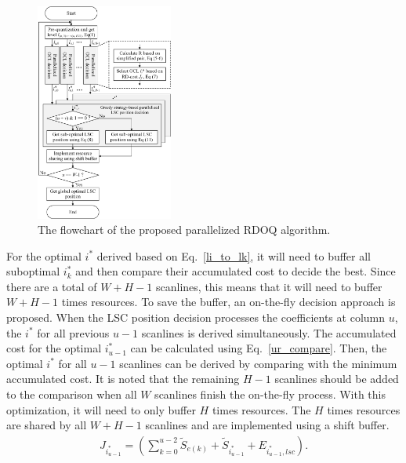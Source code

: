 \documentclass[lettersize,journal]{IEEEtran}
\begin{document}
\par
\begin{figure}[!ht]
	\centering
	\centerline{\includegraphics[width=0.40\textwidth]{figure/ProRDOQ.png}} 
	\caption{The flowchart of the proposed parallelized RDOQ algorithm.}
	\label{ProRDOQ} %
\end{figure}
For the optimal $i^{*}$ derived based on Eq.~\eqref{li_to_lk}, it will need to buffer all suboptimal $i_{k}^{*}$ and then compare their accumulated cost to decide the best. Since there are a total of $W+H-1$ scanlines, this means that it will need to buffer $W+H-1$ times resources. To save the buffer, an on-the-fly decision approach is proposed. When the LSC position decision processes the coefficients at column $u$, the $i^{*}$ for all previous $u-1$ scanlines is derived simultaneously. The accumulated cost for the optimal $i_{u-1}^{*}$ can be calculated using Eq.~\eqref{ur_compare}. Then, the optimal $i^{*}$ for all $u-1$ scanlines can be derived by comparing with the minimum accumulated cost. It is noted that the remaining $H-1$ scanlines should be added to the comparison when all $W$ scanlines finish the on-the-fly process. With this optimization, it will need to only buffer $H$ times resources. The $H$ times resources are shared by all $W+H-1$ scanlines and are implemented using a shift buffer. 
\begin{equation}
	\begin{aligned}
	\label{ur_compare}
	J_{i_{u-1 }^{*}} = \left ( \sum_{k=0}^{u-2} \widetilde{S}_{e(k)} + \widetilde{S}_{i_{u-1 }^{*}} + E_{i_{u-1 }^{*},lsc}   \right). 
\end{aligned}
\end{equation}
\end{document}
